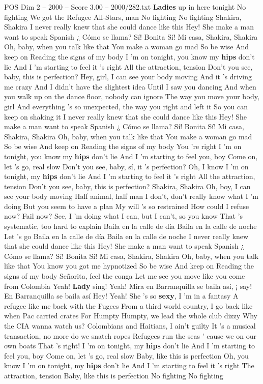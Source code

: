 \begin{textsample}{POS Dim 2 – 2000 – Score 3.00 – 2000/282.txt}  \label{ex:f2_pos_003}
\textbf{Ladies} up in here tonight No fighting We got the Refugee All-Stars, man No fighting No fighting Shakira, Shakira I never really knew that she could dance like this Hey!
She make a man want to speak Spanish ¿ Cómo se llama?
Sí!
Bonita Sí!
Mi casa, Shakira, Shakira Oh, baby, when you talk like that You make a woman go mad So be wise And keep on Reading the signs of my body I 'm on tonight, you know my \textbf{hips} don't lie And I 'm starting to feel it 's right All the attraction, tension Don't you see, baby, this is perfection?
Hey, girl, I can see your body moving And it 's driving me crazy And I didn't have the slightest idea Until I saw you dancing And when you walk up on the dance floor, nobody can ignore The way you move your body, girl And everything 's so unexpected, the way you right and left it So you can keep on shaking it I never really knew that she could dance like this Hey!
She make a man want to speak Spanish ¿ Cómo se llama?
Sí!
Bonita Sí!
Mi casa, Shakira, Shakira Oh, baby, when you talk like that You make a woman go mad So be wise And keep on Reading the signs of my body You 're right I 'm on tonight, you know my \textbf{hips} don't lie And I 'm starting to feel you, boy Come on, let 's go, real slow Don't you see, baby, sí, it 's perfection?
Oh, I know I 'm on tonight, my \textbf{hips} don't lie And I 'm starting to feel it 's right All the attraction, tension Don't you see, baby, this is perfection?
Shakira, Shakira Oh, boy, I can see your body moving Half animal, half man I don't, don't really know what I 'm doing But you seem to have a plan My will 's so restrained How could I refuse now?
Fail now?
See, I 'm doing what I can, but I can't, so you know That 's systematic, too hard to explain Baila en la calle de día Baila en la calle de noche Let 's go Baila en la calle de día Baila en la calle de noche I never really knew that she could dance like this Hey!
She make a man want to speak Spanish ¿ Cómo se llama?
Sí!
Bonita Sí!
Mi casa, Shakira, Shakira Oh, baby, when you talk like that You know you got me hypnotized So be wise And keep on Reading the signs of my body Señorita, feel the conga Let me see you move like you come from Colombia Yeah! \textbf{Lady} sing!
Yeah!
Mira en Barranquilla se baila así, ¡ say!
En Barranquilla se baila así Hey!
Yeah!
She 's so \textbf{sexy}, I 'm in a fantasy A refugee like me back with the Fugees From a third world country, I go back like when Pac carried crates For Humpty Humpty, we lead the whole club dizzy Why the CIA wanna watch us?
Colombians and Haitians, I ain't guilty It 's a musical transaction, no more do we snatch ropes Refugees run the seas ' cause we on our own boats That 's right!
I 'm on tonight, my \textbf{hips} don't lie And I 'm starting to feel you, boy Come on, let 's go, real slow Baby, like this is perfection Oh, you know I 'm on tonight, my \textbf{hips} don't lie And I 'm starting to feel it 's right The attraction, tension Baby, like this is perfection No fighting No fighting

\end{textsample}
